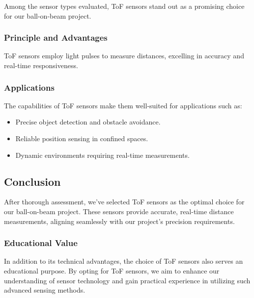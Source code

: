 \documentclass{article}
\begin{document}
Among the sensor types evaluated, ToF sensors stand out as a promising choice for our ball-on-beam project.

\subsubsection{Principle and Advantages}

ToF sensors employ light pulses to measure distances, excelling in accuracy and real-time responsiveness.

\subsubsection{Applications}

The capabilities of ToF sensors make them well-suited for applications such as:

\begin{itemize}
    \item Precise object detection and obstacle avoidance.
    \item Reliable position sensing in confined spaces.
    \item Dynamic environments requiring real-time measurements.
\end{itemize}


\subsection{Conclusion}

After thorough assessment, we've selected ToF sensors as the optimal choice for our ball-on-beam project. These sensors provide accurate, real-time distance measurements, aligning seamlessly with our project's precision requirements.

\subsubsection{Educational Value}

In addition to its technical advantages, the choice of ToF sensors also serves an educational purpose. By opting for ToF sensors, we aim to enhance our understanding of sensor technology and gain practical experience in utilizing such advanced sensing methods.
\end{document}
